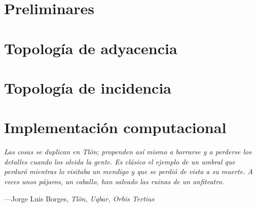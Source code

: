 \documentclass[12pt,spanish,fleqn,openright,letterpaper,pagesize]{scrbook}
\theoremstyle{definition}
\renewcommand{\contentsname}{Contenido}
\let\oldtableofcontents\tableofcontents
\renewcommand{\tableofcontents}{%
  \pdfbookmark[0]{\contentsname}{toc}%
  \oldtableofcontents%
}
\begin{document}


\tableofcontents

\newpage
\null
\thispagestyle{empty}
\newpage
{}


\chapter{Preliminares}\label{chap:Preliminares}

\chapter{Topología de adyacencia}\label{chap:topologia_de_adyacencia}

\chapter{Topología de incidencia}\label{chap:topologia_de_incidencia}

\chapter{Implementación computacional}\label{chap:implementacion_computacional}



\clearpage
{}
{}
\nocite{*}



\clearpage
\clearpage
\thispagestyle{empty}
\vspace*{\fill}
\begin{flushright}
   \begin{minipage}{0.6\textwidth}
      \raggedleft
      \textit{ Las cosas se duplican en Tlön; propenden así mismo a borrarse y a perderse los detalles cuando los olvida la gente. Es clásico el ejemplo de un umbral que perduró mientras lo visitaba un mendigo y que se perdió de vista a su muerte. A veces unos pájaros, un caballo, han salvado las ruinas de un anfiteatro.}\par
      \vspace{1ex}
      ---Jorge Luis Borges, \textit{Tlön, Uqbar, Orbis Tertius}
   \end{minipage}
\end{flushright}
\clearpage
\end{document}
